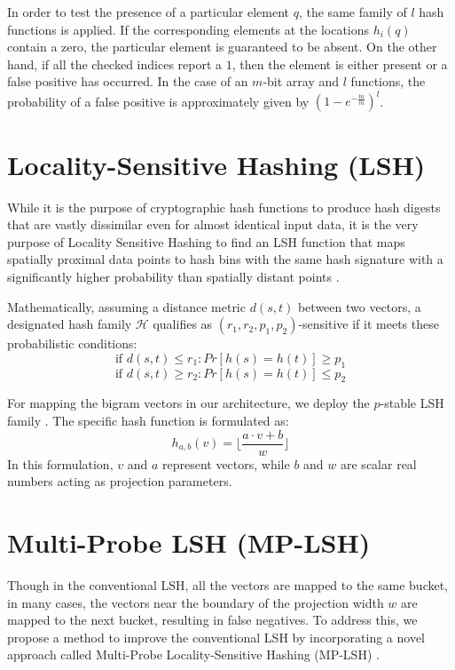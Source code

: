 In order to test the presence of a particular element $q$, the same family of $l$ hash functions is applied. If the corresponding elements at the locations $h_i(q)$ contain a zero, the particular element is guaranteed to be absent.
On the other hand, if all the checked indices report a $1$, then the element is either present or a false positive has occurred.%
In the case of an $m$-bit array and $l$ functions, the probability of a false positive is approximately given by $(1-e^{-\frac{ln}{m}})^l$. %

\section{Locality-Sensitive Hashing (LSH)}
While it is the purpose of cryptographic hash functions to produce hash digests that are vastly dissimilar even for almost identical input data, it is the very purpose of Locality Sensitive Hashing to find an LSH function that maps spatially proximal data points to hash bins with the same hash signature with a significantly higher probability than spatially distant points \cite{datar2004locality}.

Mathematically, assuming a distance metric $d(s,t)$ between two vectors, a designated hash family $\mathcal{H}$ qualifies as $(r_1, r_2, p_1, p_2)$-sensitive if it meets these probabilistic conditions:%
$$ \text{if } d(s,t) \le r_1 : Pr[h(s)=h(t)] \ge p_1 $$%
$$ \text{if } d(s,t) \ge r_2 : Pr[h(s)=h(t)] \le p_2 $$%

For mapping the bigram vectors in our architecture, we deploy the $p$-stable LSH family \cite{datar2004locality}.%
The specific hash function is formulated as:
$$ h_{a,b}(v) = \lfloor \frac{a \cdot v + b}{w} \rfloor $$%
In this formulation, $v$ and $a$ represent vectors, while $b$ and $w$ are scalar real numbers acting as projection parameters.%

\section{Multi-Probe LSH (MP-LSH)}
% 
Though in the conventional LSH, all the vectors are mapped to the same bucket, in many cases, the vectors near the boundary of the projection width $w$ are mapped to the next bucket, resulting in false negatives. To address this, we propose a method to improve the conventional LSH by incorporating a novel approach called Multi-Probe Locality-Sensitive Hashing (MP-LSH) \cite{lv2007multi}.

